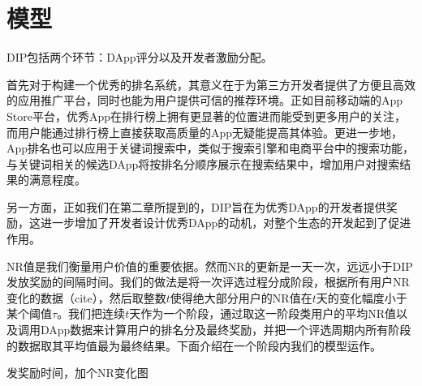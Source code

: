 \section{模型}
DIP包括两个环节：DApp评分以及开发者激励分配。

首先对于构建一个优秀的排名系统，其意义在于为第三方开发者提供了方便且高效的应用推广平台，同时也能为用户提供可信的推荐环境。正如目前移动端的App Store平台，优秀App在排行榜上拥有更显著的位置进而能受到更多用户的关注，而用户能通过排行榜上直接获取高质量的App无疑能提高其体验。更进一步地，App排名也可以应用于关键词搜索中，类似于搜索引擎和电商平台中的搜索功能，与关键词相关的候选DApp将按排名分顺序展示在搜索结果中，增加用户对搜索结果的满意程度。

另一方面，正如我们在第二章所提到的，DIP旨在为优秀DApp的开发者提供奖励，这进一步增加了开发者设计优秀DApp的动机，对整个生态的开发起到了促进作用。

NR值是我们衡量用户价值的重要依据。然而NR的更新是一天一次，远远小于DIP发放奖励的间隔时间。我们的做法是将一次评选过程分成阶段，根据所有用户NR变化的数据（cite），然后取整数$t$使得绝大部分用户的NR值在$t$天的变化幅度小于某个阈值$\tau$。我们把连续$t$天作为一个阶段，通过取这一阶段类用户的平均NR值以及调用DApp数据来计算用户的排名分及最终奖励，并把一个评选周期内所有阶段的数据取其平均值最为最终结果。下面介绍在一个阶段内我们的模型运作。


{\color{red} 发奖励时间，加个NR变化图}

